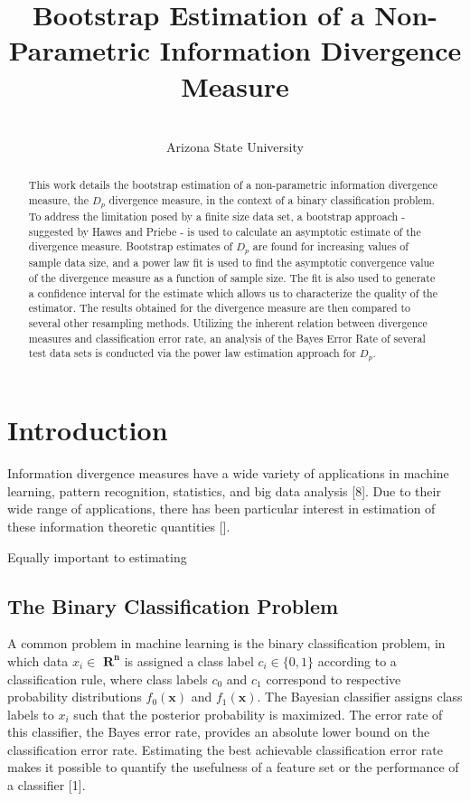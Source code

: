 \documentclass{article}
\begin{document}
	
	\title{Bootstrap Estimation of a Non-Parametric Information Divergence Measure}
	\author { \\
		\small Arizona State University}
	\date{}
	\maketitle
	
	\begin{abstract}
		
		This work details the bootstrap estimation of a non-parametric information divergence measure, the $D_p$ divergence measure, in the context of a binary classification problem. To address the limitation posed by a finite size data set, a bootstrap approach - suggested by Hawes and Priebe - is used to calculate an asymptotic estimate of the divergence measure. Bootstrap estimates of $D_p$ are found for increasing values of sample data size, and a power law fit is used to find the asymptotic convergence value of the divergence measure as a function of sample size. The fit is also used to generate a confidence interval for the estimate which allows us to characterize the quality of the estimator. The results obtained for the divergence measure are then compared to several other resampling methods.  Utilizing the inherent relation between divergence measures and classification error rate, an analysis of the Bayes Error Rate of several test data sets is conducted via the power law estimation approach for $D_p$.
	\end{abstract}
	
	\section{Introduction}
	\indent Information divergence measures have a wide variety of applications in machine learning, pattern recognition, statistics, and big data analysis [8]. Due to their wide range of applications, there has been particular interest in estimation of these information theoretic quantities []. 
	
	Equally important to estimating 
	
	\subsection*{\small The Binary Classification Problem}
	A common problem in machine learning is the binary classification problem, in which data $x_i\in$ $\mathbf{R^n}$ is assigned a class label $c_i \in \{0,1\}$ according to a classification rule, where class labels $c_0$ and $c_1$ correspond to respective probability distributions $f_0(\textbf{x})$ and $f_1(\textbf{x})$. The Bayesian classifier assigns class labels to $x_i$ such that the posterior probability is maximized. The error rate of this classifier, the Bayes error rate, provides an absolute lower bound on the classification error rate.  Estimating the best achievable classification error rate makes it possible to quantify the usefulness of a feature set or the performance of a classifier [1]. 
	
\end{document}
